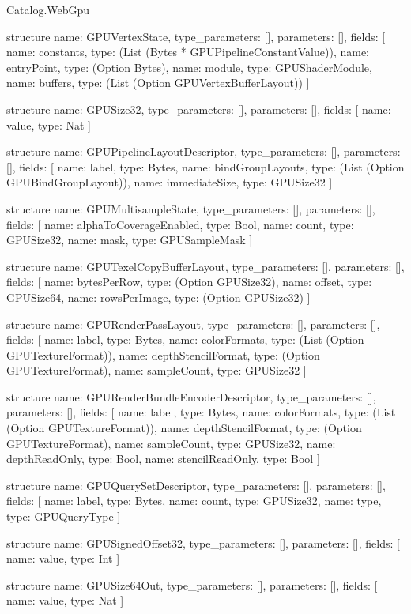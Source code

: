 \begin{lexlean}{Catalog.WebGpu}
\begin{semanticmodule}
structure{
  name: GPUVertexState,
  type_parameters: [],
  parameters: [],
  fields: [
    {name: constants, type: (List (Bytes * GPUPipelineConstantValue))},
    {name: entryPoint, type: (Option Bytes)},
    {name: module, type: GPUShaderModule},
    {name: buffers, type: (List (Option GPUVertexBufferLayout))}
  ]
}

structure{
  name: GPUSize32,
  type_parameters: [],
  parameters: [],
  fields: [
    {name: value, type: Nat}
  ]
}

structure{
  name: GPUPipelineLayoutDescriptor,
  type_parameters: [],
  parameters: [],
  fields: [
    {name: label, type: Bytes},
    {name: bindGroupLayouts, type: (List (Option GPUBindGroupLayout))},
    {name: immediateSize, type: GPUSize32}
  ]
}

structure{
  name: GPUMultisampleState,
  type_parameters: [],
  parameters: [],
  fields: [
    {name: alphaToCoverageEnabled, type: Bool},
    {name: count, type: GPUSize32},
    {name: mask, type: GPUSampleMask}
  ]
}

structure{
  name: GPUTexelCopyBufferLayout,
  type_parameters: [],
  parameters: [],
  fields: [
    {name: bytesPerRow, type: (Option GPUSize32)},
    {name: offset, type: GPUSize64},
    {name: rowsPerImage, type: (Option GPUSize32)}
  ]
}

structure{
  name: GPURenderPassLayout,
  type_parameters: [],
  parameters: [],
  fields: [
    {name: label, type: Bytes},
    {name: colorFormats, type: (List (Option GPUTextureFormat))},
    {name: depthStencilFormat, type: (Option GPUTextureFormat)},
    {name: sampleCount, type: GPUSize32}
  ]
}

structure{
  name: GPURenderBundleEncoderDescriptor,
  type_parameters: [],
  parameters: [],
  fields: [
    {name: label, type: Bytes},
    {name: colorFormats, type: (List (Option GPUTextureFormat))},
    {name: depthStencilFormat, type: (Option GPUTextureFormat)},
    {name: sampleCount, type: GPUSize32},
    {name: depthReadOnly, type: Bool},
    {name: stencilReadOnly, type: Bool}
  ]
}

structure{
  name: GPUQuerySetDescriptor,
  type_parameters: [],
  parameters: [],
  fields: [
    {name: label, type: Bytes},
    {name: count, type: GPUSize32},
    {name: type, type: GPUQueryType}
  ]
}

structure{
  name: GPUSignedOffset32,
  type_parameters: [],
  parameters: [],
  fields: [
    {name: value, type: Int}
  ]
}

structure{
  name: GPUSize64Out,
  type_parameters: [],
  parameters: [],
  fields: [
    {name: value, type: Nat}
  ]
}


\end{semanticmodule}
\end{lexlean}
